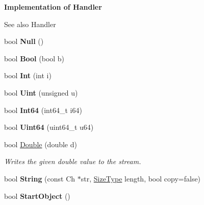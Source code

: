 \begin{Indent}{\bf Implementation of Handler}\par
{\em \begin{DoxySeeAlso}{See also}
Handler 
\end{DoxySeeAlso}
}\begin{DoxyCompactItemize}
\item 
bool {\bfseries Null} ()\hypertarget{class_writer_a7d80ac367783ac4eb8b0118924b377bd}{}\label{class_writer_a7d80ac367783ac4eb8b0118924b377bd}

\item 
bool {\bfseries Bool} (bool b)\hypertarget{class_writer_adf126d95f0aec7c2f7667df048227929}{}\label{class_writer_adf126d95f0aec7c2f7667df048227929}

\item 
bool {\bfseries Int} (int i)\hypertarget{class_writer_ae006cfa073c369c57797bc842b817ba4}{}\label{class_writer_ae006cfa073c369c57797bc842b817ba4}

\item 
bool {\bfseries Uint} (unsigned u)\hypertarget{class_writer_a20c4edc79c0d5a9402e1deb8f09feadf}{}\label{class_writer_a20c4edc79c0d5a9402e1deb8f09feadf}

\item 
bool {\bfseries Int64} (int64\+\_\+t i64)\hypertarget{class_writer_aa63032bf3dce66f817267cc451922a6e}{}\label{class_writer_aa63032bf3dce66f817267cc451922a6e}

\item 
bool {\bfseries Uint64} (uint64\+\_\+t u64)\hypertarget{class_writer_a71b2ee12ae85d181eb9abdb686565615}{}\label{class_writer_a71b2ee12ae85d181eb9abdb686565615}

\item 
bool \hyperlink{class_writer_ae80dc830a4f1d84e6eaf6b182c0ceccb}{Double} (double d)
\begin{DoxyCompactList}\small\item\em Writes the given {\ttfamily double} value to the stream. \end{DoxyCompactList}\item 
bool {\bfseries String} (const Ch $\ast$str, \hyperlink{rapidjson_8h_a5ed6e6e67250fadbd041127e6386dcb5}{Size\+Type} length, bool copy=false)\hypertarget{class_writer_ac317eb622ea116293d99e3edffe6f1c3}{}\label{class_writer_ac317eb622ea116293d99e3edffe6f1c3}

\item 
bool {\bfseries Start\+Object} ()\hypertarget{class_writer_a393fe59329dfd8110016183090b02d57}{}\label{class_writer_a393fe59329dfd8110016183090b02d57}


\end{DoxyCompactItemize}
\end{Indent}
